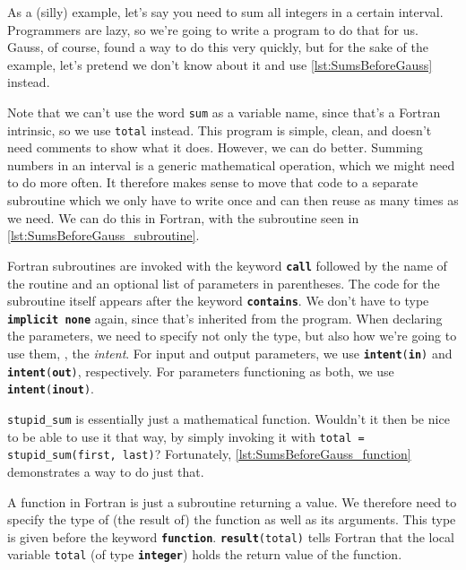 \documentclass[openany,oneside]{report}
\newcommand{\keyword}[1]{\texttt{\bfseries\color{DarkBlue}#1}}
\begin{document}
As a (silly) example, let's say you need to sum all integers in a certain interval.
Programmers are lazy, so we're going to write a program to do that for us.
Gauss, of course, found a way to do this very quickly, but for the sake of the example, let's pretend we don't know about it and use \autoref{lst:SumsBeforeGauss} instead.

Note that we can't use the word \texttt{sum} as a variable name, since that's a Fortran intrinsic, so we use \texttt{total} instead.
This program is simple, clean, and doesn't need comments to show what it does.
However, we can do better.
Summing numbers in an interval is a generic mathematical operation, which we might need to do more often.
It therefore makes sense to move that code to a separate subroutine which we only have to write once and can then reuse as many times as we need.
We can do this in Fortran, with the subroutine seen in \autoref{lst:SumsBeforeGauss_subroutine}.

Fortran subroutines are invoked with the keyword \keyword{call} followed by the name of the routine and an optional list of parameters in parentheses.
The code for the subroutine itself appears after the keyword \keyword{contains}.
We don't have to type \keyword{implicit none} again, since that's inherited from the program.
When declaring the parameters, we need to specify not only the type, but also how we're going to use them, \ie, the \emph{intent}.
For input and output parameters, we use \texttt{\keyword{intent}(\keyword{in})} and \texttt{\keyword{intent}(\keyword{out})}, respectively.
For parameters functioning as both, we use \texttt{\keyword{intent}(\keyword{inout})}.

\texttt{stupid\_sum} is essentially just a mathematical function.
Wouldn't it then be nice to be able to use it that way, by simply invoking it with \texttt{total = stupid\_sum(first, last)}? 
Fortunately, \autoref{lst:SumsBeforeGauss_function} demonstrates a way to do just that.

A function in Fortran is just a subroutine returning a value.
We therefore need to specify the type of (the result of) the function as well as its arguments.
This type is given before the keyword \keyword{function}.
\texttt{\keyword{result}(total)} tells Fortran that the local variable \texttt{total} (of type \keyword{integer}) holds the return value of the function.
\end{document}

